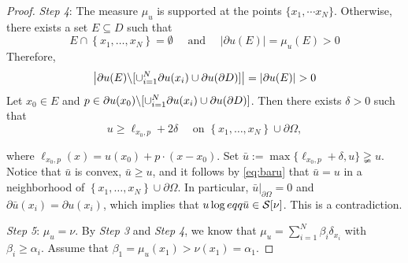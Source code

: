 \begin{proof}
		{\em Step 4}: The measure $\mu_u$ is supported at the points $\{x_1,\cdots x_N\}$. Otherwise, there exists a set $E\subseteq D$ such that
		$$
		E \cap\left\{x_1, \ldots, x_N\right\}=\emptyset \quad \text { and } \quad|\partial u(E)|=\mu_u(E)>0
		$$
		Therefore, 
		$$
		\l|\partial u(E)\backslash [\cup_{i=1}^{N} \p u(x_i)\cup \p u(\p D)]\r|=|\p u (E)|>0 
		$$
		Let $x_0\in E$ and $p\in \partial u(x_0)\backslash [\cup_{i=1}^{N} \partial u(x_i)\cup \partial u(\partial D)]$. Then there exists $\delta>0$ such that
		\begin{equation}\label{eq:baru}
			u \geq \ell_{x_0, p}+2 \delta \quad \text { on }\left\{x_1, \ldots, x_N\right\} \cup \partial \Omega, 
		\end{equation}
		
		where $\ell_{x_0, p}(x)=u(x_0)+p\cdot (x-x_0)$. Set $\bar{u}:=\max\{\ell_{x_0, p}+\delta, u\}\gneqq u$. Notice that $\bar{u}$ is convex, $\bar{u} \geqslant u$, and it follows by \eqref{eq:baru} that $\bar{u}=u$ in a neighborhood of $\left\{x_1, \ldots, x_N\right\} \cup \partial \Omega$. In particular, $\left.\bar{u}\right|_{\partial \Omega}=0$ and $\partial \bar{u}\left(x_i\right)=\partial u\left(x_i\right)$, which implies that $u\log eqq\bar u\in {\mathcal S}[\nu]$. This is a contradiction. 
		
		{\em Step 5}: $\mu_u=\nu$. By {\em Step 3} and {\em Step 4}, we know that $\mu_{u}=\sum_{i=1}^N \beta_i \delta_{x_i}$ with $\beta_i\geq \alpha_i$. Assume that $\beta_1=\mu_u(x_1)>\nu(x_1)=\alpha_1$. 
\end{proof}